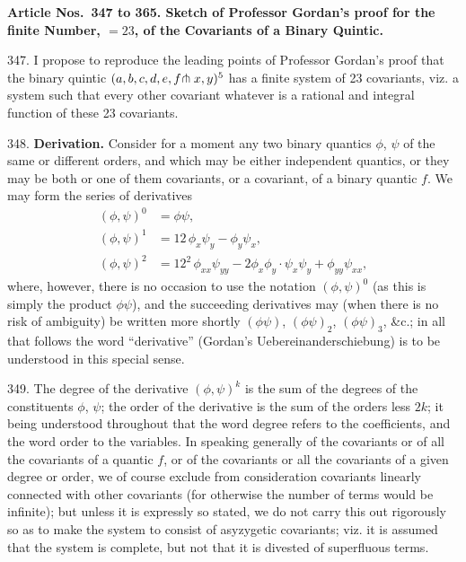 \documentclass[11pt,a4paper]{article}
\begin{document}
\newpage
\setcounter{page}{349}

\textbf{Article Nos.\ 347 to 365. Sketch of Professor Gordan's proof for the finite Number, $=23$, of the Covariants of a Binary Quintic.}

347. I propose to reproduce the leading points of Professor Gordan's proof that the binary quintic $(a, b, c, d, e, f\hspace{-0.2em}\pitchfork x, y)^{5}$ has a finite system of 23 covariants, viz. a system such that every other covariant whatever is a rational and integral function of these 23 covariants.

348. \textbf{Derivation.} Consider for a moment any two binary quantics $\phi$, $\psi$ of the same or different orders, and which may be either independent quantics, or they may be both or one of them covariants, or a covariant, of a binary quantic $f$. We may form the series of derivatives
\begin{align*}
(\phi, \psi)^{0} &= \phi\psi,\\
(\phi, \psi)^{1} &= 12\, \phi_{x}\psi_{y} - \phi_{y}\psi_{x},\\
(\phi, \psi)^{2} &= 12^{2}\, \phi_{xx}\psi_{yy} - 2\phi_{x}\phi_{y} \cdot \psi_{x}\psi_{y} + \phi_{yy}\psi_{xx},
\end{align*}
where, however, there is no occasion to use the notation $(\phi, \psi)^{0}$ (as this is simply the product $\phi\psi$), and the succeeding derivatives may (when there is no risk of ambiguity) be written more shortly $(\phi\psi)$, $(\phi\psi)_{2}$, $(\phi\psi)_{3}$, \&c.; in all that follows the word ``derivative'' (Gordan's Uebereinanderschiebung) is to be understood in this special sense.

349. The degree of the derivative $(\phi, \psi)^{k}$ is the sum of the degrees of the constituents $\phi$, $\psi$; the order of the derivative is the sum of the orders less $2k$; it being understood throughout that the word degree refers to the coefficients, and the word order to the variables. In speaking generally of the covariants or of all the covariants of a quantic $f$, or of the covariants or all the covariants of a given degree or order, we of course exclude from consideration covariants linearly connected with other covariants (for otherwise the number of terms would be infinite); but unless it is expressly so stated, we do not carry this out rigorously so as to make the system to consist of asyzygetic covariants; viz. it is assumed that the system is complete, but not that it is divested of superfluous terms.
\end{document}

